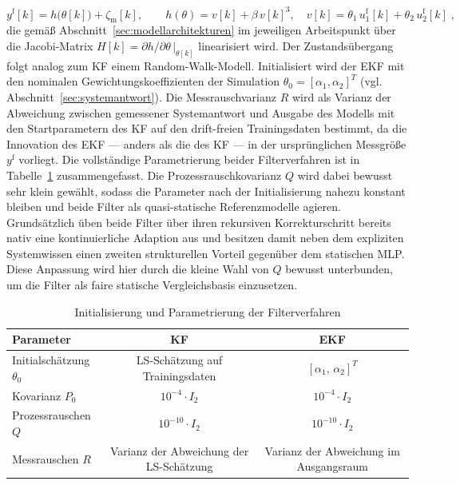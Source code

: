 %
\begin{equation}
    y^{\mathrm{f}}[k] = h\bigl(\theta[k]\bigr) + \zeta_{\mathrm{m}}[k],
    \qquad h(\theta) = v[k] + \beta\, v[k]^3,
    \quad v[k] = \theta_1\, u_1^{\mathrm{f}}[k] + \theta_2\, u_2^{\mathrm{f}}[k] \; ,
    \label{eq:ekf_beobachtung}
\end{equation}
%
die gemäß Abschnitt~\ref{sec:modellarchitekturen} im jeweiligen Arbeitspunkt über die Jacobi-Matrix $H[k] = \partial h / \partial \theta\,|_{\theta[k]}$ linearisiert wird. 
Der Zustandsübergang folgt analog zum \ac{KF} einem Random-Walk-Modell. Initialisiert wird der \ac{EKF} mit den nominalen Gewichtungskoeffizienten der Simulation $\theta_0 = [\alpha_1, \alpha_2]^T$ (vgl. Abschnitt~\ref{sec:systemantwort}). Die Messrauschvarianz $R$ wird als Varianz der Abweichung zwischen gemessener Systemantwort und Ausgabe des Modells mit den Startparametern des \ac{KF} auf den drift-freien Trainingsdaten bestimmt, da die Innovation des \ac{EKF} — anders als die des \ac{KF} — in der ursprünglichen Messgröße $y^{\mathrm{f}}$ vorliegt. Die vollständige Parametrierung beider Filterverfahren ist in Tabelle~\ref{tab:filter_params} zusammengefasst. Die Prozessrauschkovarianz $Q$ wird dabei bewusst sehr klein gewählt, sodass die Parameter nach der Initialisierung nahezu konstant bleiben und beide Filter als quasi-statische Referenzmodelle agieren. 
Grundsätzlich üben beide Filter über ihren rekursiven Korrekturschritt bereits nativ eine kontinuierliche Adaption aus und besitzen damit neben dem expliziten Systemwissen einen zweiten strukturellen Vorteil gegenüber dem statischen \ac{MLP}. Diese Anpassung wird hier durch die kleine Wahl von $Q$ bewusst unterbunden, um die Filter als faire statische Vergleichsbasis einzusetzen. \par
%
\begin{table}[tb]
\centering
\caption{Initialisierung und Parametrierung der Filterverfahren}
\label{tab:filter_params}
\begin{tabular}{lcc}
\toprule
\textbf{Parameter} & \textbf{\ac{KF}} & \textbf{\ac{EKF}} \\
\midrule
Initialschätzung $\theta_0$ & LS-Schätzung auf Trainingsdaten & $[\alpha_1,\, \alpha_2]^T$ \\
Kovarianz $P_0$ & $10^{-4} \cdot I_2$ & $10^{-4} \cdot I_2$ \\
Prozessrauschen $Q$ & $10^{-10} \cdot I_2$ & $10^{-10} \cdot I_2$ \\
Messrauschen $R$ & Varianz der Abweichung der LS-Schätzung & Varianz der Abweichung im Ausgangsraum \\
\bottomrule
\end{tabular}
\end{table}
